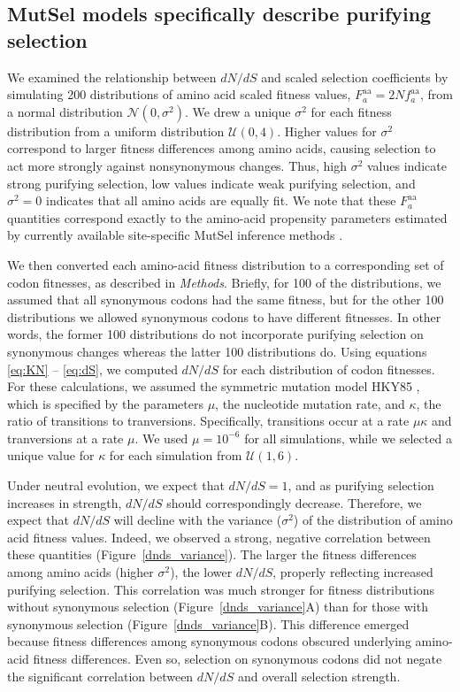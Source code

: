 \documentclass[11pt]{article}
\begin{document}
				
\subsection*{MutSel models specifically describe purifying selection}

We examined the relationship between $dN/dS$ and scaled selection coefficients by simulating 200 distributions of amino acid scaled fitness values, $F^\text{aa}_a = 2Nf^\text{aa}_a$, from a normal distribution $\mathcal{N}(0,\sigma^2)$. We drew a unique $\sigma^2$ for each fitness distribution from a uniform distribution $\mathcal{U}(0,4)$. Higher values for $\sigma^2$ correspond to larger fitness differences among amino acids, causing selection to act more strongly against nonsynonymous changes. Thus, high $\sigma^2$ values indicate strong purifying selection, low values indicate weak purifying selection, and $\sigma^2 = 0$ indicates that all amino acids are equally fit. We note that these $F^\text{aa}_a$ quantities correspond exactly to the amino-acid propensity parameters estimated by currently available site-specific MutSel inference methods \citep{RodrigueLartillot2014,Tamurietal2014}.

We then converted each amino-acid fitness distribution to a corresponding set of codon fitnesses, as described in \emph{Methods}. Briefly, for 100 of the distributions, we assumed that all synonymous codons had the same fitness, but for the other 100 distributions we allowed synonymous codons to have different fitnesses. In other words, the former 100 distributions do not incorporate purifying selection on synonymous changes whereas the latter 100 distributions do. Using equations \eqref{eq:KN} -- \eqref{eq:dS}, we computed $dN/dS$ for each distribution of codon fitnesses. For these calculations, we assumed the symmetric mutation model HKY85 \citep{HKY85}, which is specified by the parameters $\mu$, the nucleotide mutation rate, and $\kappa$, the ratio of transitions to tranversions. Specifically, transitions occur at a rate $\mu\kappa$ and tranversions at a rate $\mu$. We used $\mu = 10^{-6}$ for all simulations, while we selected a unique value for $\kappa$ for each simulation from $\mathcal{U}(1,6)$.

Under neutral evolution, we expect that $dN/dS = 1$, and as purifying selection increases in strength, $dN/dS$ should correspondingly decrease. Therefore, we expect that $dN/dS$ will decline with the variance ($\sigma^2$) of the distribution of amino acid fitness values. Indeed, we observed a strong, negative correlation between these quantities (Figure~\ref{dnds_variance}). The larger the fitness differences among amino acids (higher $\sigma^2$), the lower $dN/dS$, properly reflecting increased purifying selection. This correlation was much stronger for fitness distributions without synonymous selection (Figure~\ref{dnds_variance}A) than for those with synonymous selection (Figure~\ref{dnds_variance}B). This difference emerged because fitness differences among synonymous codons obscured underlying amino-acid fitness differences. Even so, selection on synonymous codons did not negate the significant correlation between $dN/dS$ and overall selection strength.
\end{document}
